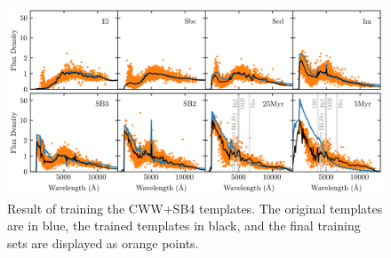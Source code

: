 \begin{figure}
    \centering
    \includegraphics{figures/cwwsb4_trained.png}
    \caption{Result of training the CWW+SB4 templates. The original templates are in blue, the trained templates in black, and the final training sets are displayed as orange points.}
    \label{fig:cwwsb4_trained}
\end{figure}

